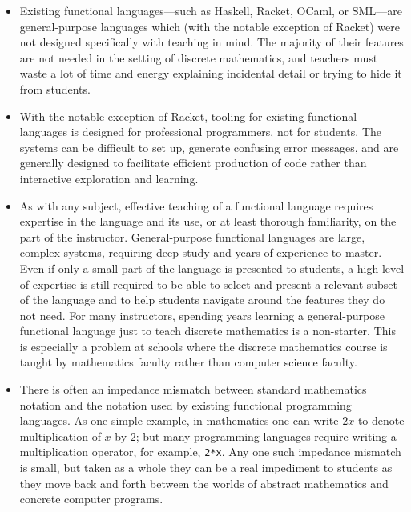 \documentclass[submission,copyright,creativecommons]{eptcs}
\begin{document}
\begin{itemize}
\item Existing functional languages---such as Haskell, Racket, OCaml,
  or SML---are general-purpose languages which (with the notable
  exception of Racket) were not designed specifically with teaching in
  mind.  The majority of their features are not needed in the setting
  of discrete mathematics, and teachers must waste a lot of time and
  energy explaining incidental detail or trying to hide it from
  students.
\item With the notable exception of Racket, tooling for existing
  functional languages is designed for professional programmers, not
  for students.  The systems can be difficult to set up, generate
  confusing error messages, and are generally designed to facilitate
  efficient production of code rather than interactive exploration and
  learning.
\item As with any subject, effective teaching of a functional language
  requires expertise in the language and its use, or at least thorough
  familiarity, on the part of the instructor. General-purpose
  functional languages are large, complex systems, requiring deep
  study and years of experience to master.  Even if only a small part
  of the language is presented to students, a high level of expertise
  is still required to be able to select and present a relevant subset
  of the language and to help students navigate around the features
  they do not need.  For many instructors, spending years learning a
  general-purpose functional language just to teach discrete
  mathematics is a non-starter.  This is especially a problem at
  schools where the discrete mathematics course is taught by
  mathematics faculty rather than computer science faculty.
\item There is often an impedance mismatch between standard
  mathematics notation and the notation used by existing functional
  programming languages.  As one simple example, in mathematics one
  can write $2x$ to denote multiplication of $x$ by $2$; but many
  programming languages require writing a multiplication operator, for
  example, \texttt{2*x}.  Any one such impedance mismatch is small, but taken
  as a whole they can be a real impediment to students as they move
  back and forth between the worlds of abstract mathematics and
  concrete computer programs.
\end{itemize}
\end{document}
